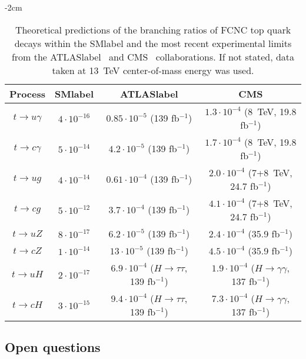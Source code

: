 \begin{table}[htbp]
    \addtolength{\leftskip} {-2cm} %
    \addtolength{\rightskip}{-2cm}
    \begin{tabular}{c|c|cc}
    \toprule\toprule
    Process & \acrshort{SMlabel} & \acrshort{ATLASlabel} & CMS \\ \midrule
    $t\to u\gamma$  & $4\cdot 10^{-16}$ &  $0.85\cdot 10^{-5}$ (139 fb$^{-1}$)  & $1.3\cdot 10^{-4}$ (8~TeV, 19.8 fb$^{-1}$) \\ 
    $t\to c\gamma$  & $5\cdot 10^{-14}$ &  $4.2\cdot 10^{-5}$ (139 fb$^{-1}$)  & $1.7\cdot 10^{-4}$ (8~TeV, 19.8 fb$^{-1}$) \\ \midrule
    $t\to ug$  & $4\cdot 10^{-14}$ &  $0.61\cdot 10^{-4}$ (139 fb$^{-1}$)  & $2.0\cdot 10^{-4}$ (7+8~TeV, 24.7 fb$^{-1}$) \\ 
    $t\to cg$  & $5\cdot 10^{-12}$ &  $3.7\cdot 10^{-4}$ (139 fb$^{-1}$)  & $4.1\cdot 10^{-4}$ (7+8~TeV, 24.7 fb$^{-1}$) \\ \midrule
    $t\to uZ$  & $8\cdot 10^{-17}$ &  $6.2\cdot 10^{-5}$ (139 fb$^{-1}$)  & $2.4\cdot 10^{-4}$ (35.9 fb$^{-1}$) \\ 
    $t\to cZ$  & $1\cdot 10^{-14}$ &  $13\cdot 10^{-5}$ (139 fb$^{-1}$)  & $4.5\cdot 10^{-4}$ (35.9 fb$^{-1}$) \\ \midrule
    $t\to uH$  & $2\cdot 10^{-17}$ &  $6.9\cdot 10^{-4}$ ($H\to\tau\tau$, 139 fb$^{-1}$) & $1.9\cdot 10^{-4}$ ($H\to\gamma\gamma$, 137 fb$^{-1}$) \\ 
    $t\to cH$  & $3\cdot 10^{-15}$ &  $9.4\cdot 10^{-4}$ ($H\to\tau\tau$, 139 fb$^{-1}$) & $7.3\cdot 10^{-4}$ ($H\to\gamma\gamma$, 137 fb$^{-1}$) \\ \midrule
    \bottomrule\bottomrule
    \end{tabular}
    \caption{Theoretical predictions of the branching ratios of FCNC top quark decays within the \acrshort{SMlabel} \cite{SMFCNC} and the most recent experimental limits from the \acrshort{ATLASlabel}~\cite{ATLAStqgamma,ATLAStqg,ATLAStqHtautau} and CMS~\cite{CMStqgamma,CMStqg,CMStqZ,CMStqHgammagamma} collaborations. If not stated, data taken at 13~TeV center-of-mass energy was used.}
    \label{tabSM:FCNCmeasurements}
    \end{table}

\subsection{Open questions}
\label{subsec:openquestions}

